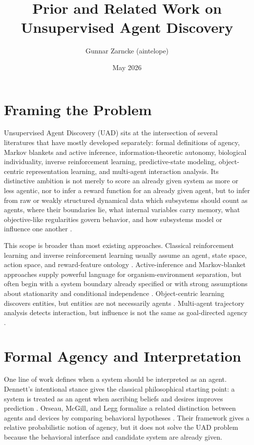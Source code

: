 \documentclass[11pt]{article}
\title{Prior and Related Work on Unsupervised Agent Discovery}
\author{Gunnar Zarncke (aintelope)}
\date{May 2026}
\begin{document}
\maketitle
\onehalfspacing
\sloppy

\section{Framing the Problem}

Unsupervised Agent Discovery (UAD) sits at the intersection of several literatures that have mostly developed separately: formal definitions of agency, Markov blankets and active inference, information-theoretic autonomy, biological individuality, inverse reinforcement learning, predictive-state modeling, object-centric representation learning, and multi-agent interaction analysis. Its distinctive ambition is not merely to score an already given system as more or less agentic, nor to infer a reward function for an already given agent, but to infer from raw or weakly structured dynamical data which subsystems should count as agents, where their boundaries lie, what internal variables carry memory, what objective-like regularities govern behavior, and how subsystems model or influence one another \cite{zarncke2025uad}.

This scope is broader than most existing approaches. Classical reinforcement learning and inverse reinforcement learning usually assume an agent, state space, action space, and reward-feature ontology \cite{ng2000irl,ziebart2008maxent,arora2021survey}. Active-inference and Markov-blanket approaches supply powerful language for organism-environment separation, but often begin with a system boundary already specified or with strong assumptions about stationarity and conditional independence \cite{friston2010free,kirchhoff2018markov,parr2020markov}. Object-centric learning discovers entities, but entities are not necessarily agents \cite{locatello2020slot,kipf2020contrastive}.
Multi-agent trajectory analysis detects interaction, but influence is not the same as goal-directed agency \cite{schreiber2000te,barnett2009gc,lizier2010transfer}.

\section{Formal Agency and Interpretation}

One line of work defines when a system should be interpreted as an agent. Dennett's intentional stance gives the classical philosophical starting point: a system is treated as an agent when ascribing beliefs and desires improves prediction \cite{dennett1981true}. Orseau, McGill, and Legg formalize a related distinction between agents and devices by comparing behavioral hypotheses \cite{orseau2018agents}. Their framework gives a relative probabilistic notion of agency, but it does not solve the UAD problem because the behavioral interface and candidate system are already given.
\end{document}
